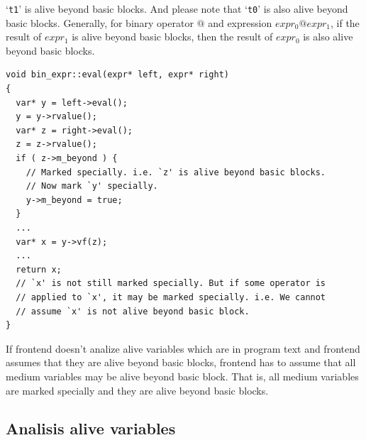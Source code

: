 `{\tt{t1}}' is alive beyond basic blocks. And please
note that `{\tt{t0}}' is also alive beyond basic blocks.
Generally, for binary operator $@$ and expression $expr_0 @ expr_1$,
if the result of $expr_1$ is alive beyond basic blocks,
then the result of $expr_0$ is also  alive beyond basic blocks.
\begin{verbatim}
void bin_expr::eval(expr* left, expr* right)
{
  var* y = left->eval();
  y = y->rvalue();
  var* z = right->eval();
  z = z->rvalue();
  if ( z->m_beyond ) {
    // Marked specially. i.e. `z' is alive beyond basic blocks.
    // Now mark `y' specially.
    y->m_beyond = true;
  }
  ...
  var* x = y->vf(z);
  ...
  return x;
  // `x' is not still marked specially. But if some operator is
  // applied to `x', it may be marked specially. i.e. We cannot
  // assume `x' is not alive beyond basic block.
}
\end{verbatim}
If frontend doesn't analize alive variables which are in program text
and frontend assumes that they are alive beyond basic blocks,
frontend has to assume that all medium variables may be alive beyond
basic block. That is, all medium variables are marked specially and
they are alive beyond basic blocks.

\subsection{Analisis alive variables}

